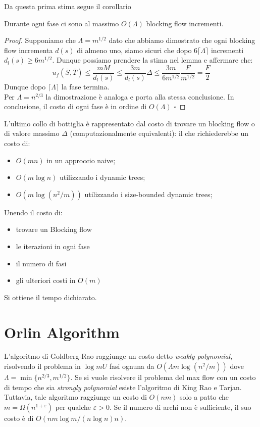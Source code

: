 \documentclass[a4paper, 11pt]{report}
\newcommand*{\QED}{\null\nobreak\hfill\ensuremath{\square}}%
\begin{document}
    Da questa prima stima segue il corollario
    \begin{corollary}{}{}
    Durante ogni fase ci sono al massimo $O(\Lambda)$ blocking flow incrementi.
    \end{corollary}
    \begin{proof}
        Supponiamo che $\Lambda = m^{1/2}$ dato che abbiamo dimostrato che ogni blocking flow incrementa $d(s)$ di almeno uno, siamo sicuri che dopo $6\lceil \Lambda\rceil$ incrementi $d_l(s) \ge 6 m^{1/2}$.
        Dunque possiamo prendere la stima nel lemma e affermare che:
        \[ u_f(\bar{S}, \bar{T})\le \frac{mM}{d_l(s)}\le \frac{3m}{d_l(s)}\Delta\le \frac{3m}{6m^{1/2}}\frac{F}{m^{1/2}} = \frac{F}{2}\]
        Dunque dopo $\lceil \Lambda\rceil$ la fase termina.\\
        Per $\Lambda = n^{2/3}$ la dimostrazione è analoga e porta alla stessa conclusione. 
        In conclusione, il costo di ogni fase è in ordine di $O(\Lambda)$ \QED
    \end{proof}
    
    L'ultimo collo di bottiglia è rappresentato dal costo di trovare un blocking flow o di valore massimo $\Delta$ (computazionalmente equivalenti):
    il che richiederebbe un costo di:
    \begin{itemize}
        \item $O(mn)$ in un approccio naive;
        \item $O(m\log n)$ utilizzando i dynamic trees;
        \item $O(m \log(n^2/m))$ utilizzando i size-bounded dynamic trees;
    \end{itemize}
    Unendo il costo di:
    \begin{itemize}[label=$\times$]
        \item trovare un Blocking flow
        \item le iterazioni in ogni fase
        \item il numero di fasi
        \item gli ulteriori costi in $O(m)$
    \end{itemize}
    Si ottiene il tempo dichiarato.


\chapter{Orlin Algorithm}
L'algoritmo di Goldberg-Rao raggiunge un costo detto \textit{weakly polynomial}, risolvendo il problema in $\log mU$ fasi ognuna da $O(\Lambda m \log(n^2/m))$ dove $\Lambda = \min \{n^{2/3}, m^{1/2}\}$.
Se si vuole risolvere il problema del max flow con un costo di tempo che sia \textit{strongly polynomial} esiste l'algoritmo di King Rao e Tarjan. Tuttavia, tale algoritmo raggiunge un costo di $O(nm)$ solo a patto che $ m = \Omega (n^{1+\varepsilon})$ per qualche $\varepsilon > 0$. 
Se il numero di archi non è sufficiente, il suo costo è di $O(nm \log m/(n \log n) n)$.
\end{document}
